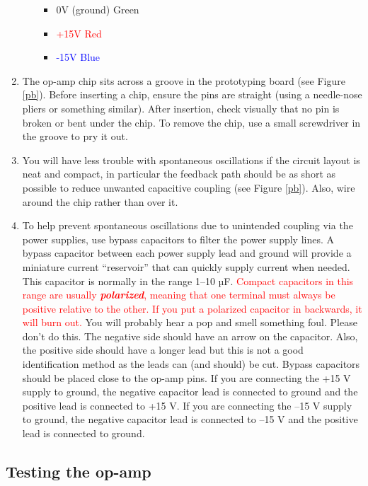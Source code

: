 \documentclass[10pt]{PhysLab1C} %
\begin{document}
\begin{enumerate}
\begin{enumerate}
    \begin{itemize}
    \item
      \textcolor{OliveGreen}{0V (ground) Green}
    \item
      \textcolor{red}{+15V Red}
    \item
      \textcolor{blue}{-15V Blue}
    \end{itemize}
  \end{enumerate}
\item
  The op-amp chip sits across a groove in the prototyping board (see Figure \ref{pb}). Before inserting a chip, ensure the pins are straight (using a
  needle-nose pliers or something similar). After insertion, check
  visually that no pin is broken or bent under the chip. To remove the
  chip, use a small screwdriver in the groove to pry it out.
\item
  You will have less trouble with spontaneous oscillations if the
  circuit layout is neat and compact, in particular the feedback path
  should be as short as possible to reduce unwanted capacitive coupling
  (see Figure \ref{pb}). Also, wire around the chip rather than over it.
\item
  To help prevent spontaneous oscillations due to unintended coupling
  via the power supplies, use bypass capacitors to filter the power
  supply lines. A bypass capacitor between each power supply lead and
  ground will provide a miniature current ``reservoir'' that can quickly
  supply current when needed. This capacitor is normally in the range
  1--10 µF. \textcolor{red}{Compact capacitors in this range are usually
  \emph{\textbf{polarized}}, meaning that one terminal must always be
  positive relative to the other. If you put a polarized capacitor in
  backwards, it will burn out.} You will probably hear a pop and smell
  something foul. Please don't do this. The negative side should have an
  arrow on the capacitor. Also, the positive side should have a longer
  lead but this is not a good identification method as the leads can
  (and should) be cut. Bypass capacitors should be placed close to the
  op-amp pins. If you are connecting the +15 V supply to ground, the
  negative capacitor lead is connected to ground and the positive lead
  is connected to +15 V. If you are connecting the --15 V supply to
  ground, the negative capacitor lead is connected to --15 V and the
  positive lead is connected to ground.
\end{enumerate}

\subsection{Testing the op-amp}
\end{document}
